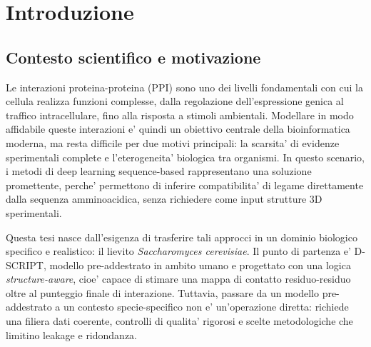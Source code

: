 \documentclass[12pt,a4paper,oneside]{report} %
\begin{document}
\newpage
\thispagestyle{empty}
\null \newpage %


\begin{abstract}
Inserisci qui il riassunto della tua tesi magistrale...
\end{abstract}

\tableofcontents %
\listoffigures   %
\lstlistoflistings %

\newpage
{} %
\setcounter{page}{1}


\chapter{Introduzione}
\section{Contesto scientifico e motivazione}
Le interazioni proteina-proteina (PPI) sono uno dei livelli fondamentali con cui la cellula realizza funzioni complesse, dalla regolazione dell'espressione genica al traffico intracellulare, fino alla risposta a stimoli ambientali. Modellare in modo affidabile queste interazioni e' quindi un obiettivo centrale della bioinformatica moderna, ma resta difficile per due motivi principali: la scarsita' di evidenze sperimentali complete e l'eterogeneita' biologica tra organismi. In questo scenario, i metodi di deep learning sequence-based rappresentano una soluzione promettente, perche' permettono di inferire compatibilita' di legame direttamente dalla sequenza amminoacidica, senza richiedere come input strutture 3D sperimentali.

Questa tesi nasce dall'esigenza di trasferire tali approcci in un dominio biologico specifico e realistico: il lievito \textit{Saccharomyces cerevisiae}. Il punto di partenza e' D-SCRIPT, modello pre-addestrato in ambito umano e progettato con una logica \textit{structure-aware}, cioe' capace di stimare una mappa di contatto residuo-residuo oltre al punteggio finale di interazione. Tuttavia, passare da un modello pre-addestrato a un contesto specie-specifico non e' un'operazione diretta: richiede una filiera dati coerente, controlli di qualita' rigorosi e scelte metodologiche che limitino leakage e ridondanza.
\end{document}
